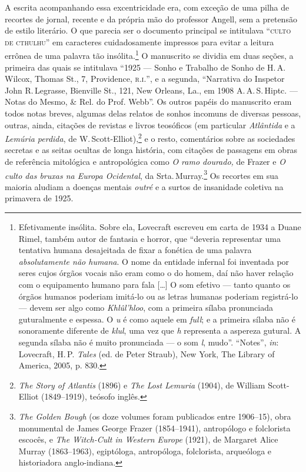 A escrita acompanhando essa excentricidade era, com exceção de uma pilha
de recortes de jornal, recente e da própria mão do professor Angell, sem
a pretensão de estilo literário. O que parecia ser o documento principal
se intitulava ``\textsc{culto de cthulhu}'' em caracteres cuidadosamente
impressos para evitar a leitura errônea de uma palavra tão
insólita.\footnote{Efetivamente insólita. Sobre ela, Lovecraft escreveu
  em carta de 1934 a Duane Rimel, também autor de fantasia e horror, que
  ``deveria representar uma tentativa humana desajeitada de fixar a
  fonética de uma palavra \emph{absolutamente não humana}. O nome da
  entidade infernal foi inventada por seres cujos órgãos vocais não eram
  como o do homem, daí não haver relação com o equipamento humano para
  fala [\ldots{}] O som efetivo --- tanto quanto os órgãos humanos poderiam
  imitá-lo ou as letras humanas poderiam registrá-lo --- devem ser algo
  como \emph{Khlûl'hloo}, com a primeira sílaba pronunciada guturalmente
  e espessa. O \emph{u} é como aquele em \emph{full}; e a primeira
  sílaba não é sonoramente diferente de \emph{klul}, uma vez que
  \emph{h} representa a aspereza gutural. A segunda sílaba não é muito
  pronunciada --- o som \emph{l}, mudo''. ``Notes'', \emph{in}:
  Lovecraft, H.\,P. \emph{Tales} (ed. de Peter Straub), New York, The
  Library of America, 2005, p. 830.} O manuscrito se dividia em duas
seções, a primeira das quais se intitulava ``1925 --- Sonho e Trabalho
de Sonho de H.\,A. Wilcox, Thomas St., 7, Providence, \textsc{r.i.}'', e a
segunda, ``Narrativa do Inspetor John R.\,Legrasse, Bienville St., 121,
New Orleans, La., em 1908 A.\,A.\,S.\,Hiptc. --- Notas do Mesmo, \& Rel. do
Prof. Webb''. Os outros papéis do manuscrito eram todos notas breves,
algumas delas relatos de sonhos incomuns de diversas pessoas, outras,
ainda, citações de revistas e livros teosóficos (em particular
\emph{Atlântida} e a \emph{Lemúria perdida}, de W.\,Scott-Elliot),\footnote{\emph{The
  Story of Atlantis} (1896) e \emph{The Lost Lemuria} (1904), de William
  Scott-Elliot (1849--1919), teósofo inglês.} e o resto, comentários
sobre as sociedades secretas e as seitas ocultas de longa história, com
citações de passagens em obras de referência mitológica e antropológica
como \emph{O ramo dourado,} de Frazer e \emph{O culto das bruxas na
Europa Ocidental}, da Srta.\,Murray.\footnote{\emph{The Golden Bough} (os
  doze volumes foram publicados entre 1906--15), obra monumental de James
  George Frazer (1854--1941), antropólogo e folclorista escocês, e
  \emph{The Witch-Cult in Western Europe} (1921), de Margaret Alice
  Murray (1863--1963), egiptóloga, antropóloga, folclorista, arqueóloga e
  historiadora anglo-indiana.} Os recortes em sua maioria aludiam a
doenças mentais \emph{outré} e a surtos de insanidade coletiva na
primavera de 1925.

